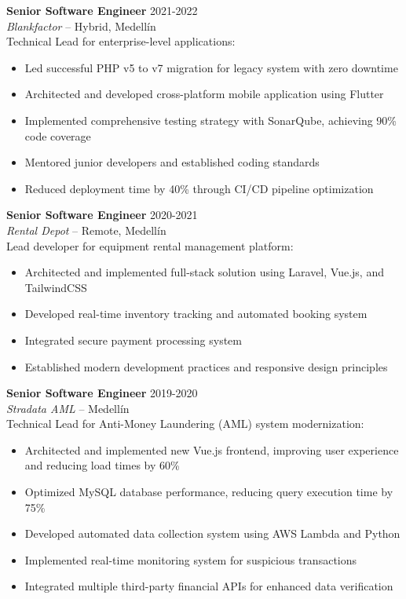 \documentclass[11pt,a4paper]{article}
\begin{document}
\noindent\textbf{Senior Software Engineer} \hfill 2021-2022\\
\textit{Blankfactor} -- Hybrid, Medellín\\
Technical Lead for enterprise-level applications:
\begin{itemize}[noitemsep]
  \item Led successful PHP v5 to v7 migration for legacy system with zero downtime
  \item Architected and developed cross-platform mobile application using Flutter
  \item Implemented comprehensive testing strategy with SonarQube, achieving 90\% code coverage
  \item Mentored junior developers and established coding standards
  \item Reduced deployment time by 40\% through CI/CD pipeline optimization
\end{itemize}

\noindent\textbf{Senior Software Engineer} \hfill 2020-2021\\
\textit{Rental Depot} -- Remote, Medellín\\
Lead developer for equipment rental management platform:
\begin{itemize}[noitemsep]
  \item Architected and implemented full-stack solution using Laravel, Vue.js, and TailwindCSS
  \item Developed real-time inventory tracking and automated booking system
  \item Integrated secure payment processing system
  \item Established modern development practices and responsive design principles
\end{itemize}

\noindent\textbf{Senior Software Engineer} \hfill 2019-2020\\
\textit{Stradata AML} -- Medellín\\
Technical Lead for Anti-Money Laundering (AML) system modernization:
\begin{itemize}[noitemsep]
  \item Architected and implemented new Vue.js frontend, improving user experience and reducing load times by 60\%
  \item Optimized MySQL database performance, reducing query execution time by 75\%
  \item Developed automated data collection system using AWS Lambda and Python
  \item Implemented real-time monitoring system for suspicious transactions
  \item Integrated multiple third-party financial APIs for enhanced data verification
\end{itemize}
\end{document}
